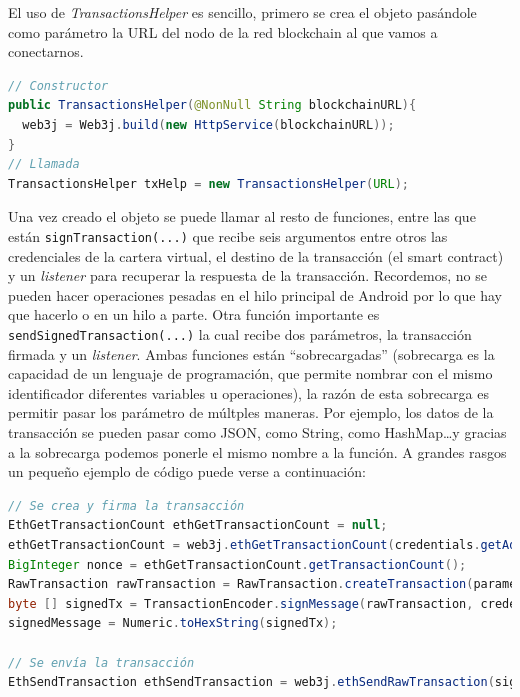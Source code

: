 El uso de \emph{TransactionsHelper} es sencillo, primero se crea el objeto pasándole como parámetro la URL del nodo de la red blockchain al que vamos a conectarnos.
\begin{lstlisting}[language=Java,float=ht,caption={[Java] Constructor de TransactionsHelper},label=lst:constructor]
// Constructor
public TransactionsHelper(@NonNull String blockchainURL){
  web3j = Web3j.build(new HttpService(blockchainURL));
}
// Llamada 
TransactionsHelper txHelp = new TransactionsHelper(URL);
\end{lstlisting}

Una vez creado el objeto se puede llamar al resto de funciones, entre las que están \verb|signTransaction(...)| que recibe seis argumentos entre otros las credenciales de la cartera virtual, el destino de la transacción (el smart contract) y un \emph{listener} para recuperar la respuesta de la transacción. Recordemos, no se pueden hacer operaciones pesadas en el hilo principal de Android por lo que hay que hacerlo o en un hilo a parte. Otra función importante es \verb|sendSignedTransaction(...)| la cual recibe dos parámetros, la transacción firmada y un \emph{listener}. Ambas funciones están ``sobrecargadas'' (sobrecarga es la capacidad de un lenguaje de programación, que permite nombrar con el mismo identificador diferentes variables u operaciones), la razón de esta sobrecarga es permitir pasar los parámetro de múltples maneras. Por ejemplo, los datos de la transacción se pueden pasar como JSON, como String, como HashMap\dots y gracias a la sobrecarga podemos ponerle el mismo nombre a la función. A grandes rasgos un pequeño ejemplo de código puede verse a continuación: 

\begin{lstlisting}[language=Java,float=ht,caption={[Java] Firmar y Enviar transacciones.},label=lst:transactionHelper]
// Se crea y firma la transacción
EthGetTransactionCount ethGetTransactionCount = null;
ethGetTransactionCount = web3j.ethGetTransactionCount(credentials.getAddress(), DefaultBlockParameterName.LATEST).send();
BigInteger nonce = ethGetTransactionCount.getTransactionCount();
RawTransaction rawTransaction = RawTransaction.createTransaction(parametrosJSON);
byte [] signedTx = TransactionEncoder.signMessage(rawTransaction, credentials)
signedMessage = Numeric.toHexString(signedTx);

// Se envía la transacción
EthSendTransaction ethSendTransaction = web3j.ethSendRawTransaction(signedMessage).send();
\end{lstlisting}


